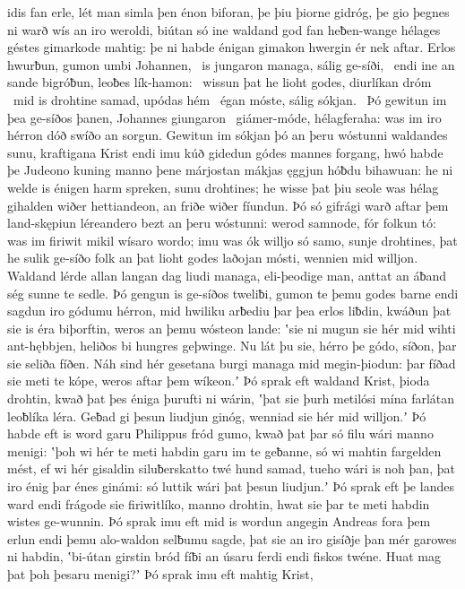 idis fan erle, lét man simla þen énon biforan,
þe þiu þiorne gidróg, þe gio þegnes ni warð
wís an iro weroldi, biútan só ine waldand god
fan heƀen-wange hélages géstes
gimarkode mahtig: þe ni habde énigan gimakon hwergin
ér nek aftar. Erlos hwurƀun,
gumon umbi Johannen, \hld\ is jungaron managa,
sálig ge-síði, \hld\ endi ine an sande bigróƀun,
leoƀes lík-hamon: \hld\ wissun þat he lioht godes,
diurlíkan dróm \hld\ mid is drohtine samad,
upódas hém \hld\ égan móste,
sálig sókjan. \hld\ Þó gewitun im þea ge-síðos þanen,
Johannes giungaron \hld\ giámer-móde,
hélagferaha: was im iro hérron dóð
swíðo an sorgun. Gewitun im sókjan þó
an þeru wóstunni waldandes sunu,
kraftigana Krist endi imu kúð gidedun
gódes mannes forgang, hwó habde þe Judeono kuning
manno þene márjostan mákjas ęggjun
hóƀdu bihawuan: he ni welde is énigen harm spreken,
sunu drohtines; he wisse þat þiu seole was
hélag gihalden wiðer hettiandeon,
an friðe wiðer fíundun. Þó só gifrági warð
aftar þem land-skępiun léreandero bezt
an þeru wóstunni: werod samnode,
fór folkun tó: was im firiwit mikil
wísaro wordo; imu was ók willjo só samo,
sunje drohtines, þat he sulik ge-síðo folk
an þat lioht godes laðojan mósti,
wennien mid willjon. Waldand lérde
allan langan dag liudi managa,
eli-þeodige man, anttat an áƀand ség
sunne te sedle. Þó gengun is ge-síðos tweliƀi,
gumon te þemu godes barne endi sagdun iro gódumu hérron,
mid hwiliku arƀediu þar þea erlos liƀdin, kwáðun þat sie is éra biþorftin,
weros an þemu wósteon lande: ʽsie ni mugun sie hér mid wihti ant-hębbjen,
heliðos bi hungres geþwinge. Nu lát þu sie, hérro þe gódo,
síðon, þar sie seliða fíðen. Náh sind hér gesetana burgi
managa mid megin-þiodun: þar fíðad sie meti te kópe,
weros aftar þem wíkeon.ʼ Þó sprak eft waldand Krist,
þioda drohtin, kwað þat þes éniga þurufti ni wárin,
ʽþat sie þurh metilósi mína farlátan
leoƀlíka léra. Geƀad gi þesun liudjun ginóg,
wenniad sie hér mid willjon.ʼ Þó habde eft is word garu
Philippus fród gumo, kwað þat þar só filu wári
manno menigi: ʽþoh wi hér te meti habdin
garu im te geƀanne, só wi mahtin fargelden mést,
ef wi hér gisaldin siluƀerskatto
twé hund samad, tueho wári is noh þan,
þat iro énig þar énes ginámi:
só luttik wári þat þesun liudjun.ʼ Þó sprak eft þe landes ward
endi frágode sie firiwitlíko,
manno drohtin, hwat sie þar te meti habdin
wistes ge-wunnin. Þó sprak imu eft mid is wordun angegin
Andreas fora þem erlun endi þemu alo-waldon
selƀumu sagde, þat sie an iro gisíðje þan mér
garowes ni habdin, ʽbi-útan girstin bród
fíƀi an úsaru ferdi endi fiskos twéne.
Huat mag þat þoh þesaru menigi?ʼ Þó sprak imu eft mahtig Krist,
